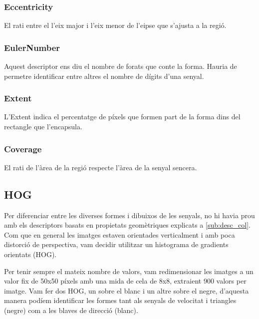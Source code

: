 \subsubsection{Eccentricity}

El rati entre el l'eix major i l'eix menor de l'e\lgem ipse que s'ajusta a la regió.

\subsubsection{EulerNumber}

Aquest descriptor ens diu el nombre de forats que conte la forma. Hauria de permetre identificar entre
altres el nombre de dígits d'una senyal.

\subsubsection{Extent}

L'Extent indica el percentatge de píxels que formen part de la forma dins del rectangle que l'encapsula.

\subsubsection{Coverage}

El rati de l'àrea de la regió respecte l'àrea de la senyal sencera.

\subsection{HOG}%
\label{sub:HOG}

Per diferenciar entre les diverses formes i dibuixos de les senyals, no hi havia prou amb els descriptors basats en
propietats geomètriques explicats a \cref{sub:desc_col}. Com que en general les imatges estaven orientades verticalment
i amb poca distorci\'o de perspectiva, vam decidir utilitzar un histograma de gradients orientats (HOG).

Per tenir sempre el mateix nombre de valors, vam redimensionar les imatges a un valor fix de 50x50 píxels amb
una mida de cela de 8x8, extraient  900 valors per imatge. Vam fer dos HOG, un sobre el blanc i un altre sobre el negre,
d'aquesta manera podíem identificar les formes tant als senyals de velocitat i
triangles (negre) com a les blaves de direcció (blanc).


